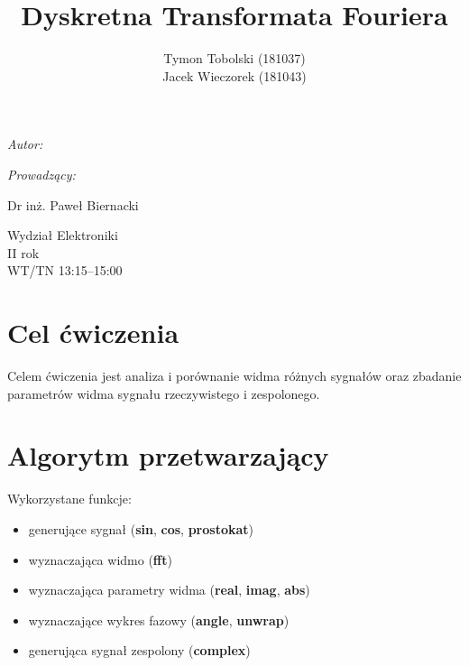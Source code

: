 \documentclass[wide,a4paper,titlepage,12pt]{mwart}
\title{Dyskretna Transformata Fouriera}
\author{Tymon Tobolski (181037)\\ Jacek Wieczorek (181043)}
\makeatletter
\renewcommand{\maketitle}{
\begin{titlepage}
  \begin{center}
    \vspace*{3cm}
    \LARGE \@title \par
    \vspace{2cm}
    \textit{\small Autor:}\par
    \normalsize \@author\par \normalsize
    \vspace{3cm}
    \textit{\small Prowadzący:}\par
    Dr inż. Paweł Biernacki \par
    \vspace{2cm}
    Wydział Elektroniki\\ II rok\\ WT/TN 13:15--15:00 \par
    \vspace{5cm}
    \small \@date
  \end{center}
\end{titlepage}
}
\makeatother
\begin{document}
  \maketitle
  \section{Cel ćwiczenia} %
  \label{sec:Cel}
    Celem ćwiczenia jest analiza i porównanie widma różnych sygnałów oraz zbadanie parametrów widma sygnału rzeczywistego i zespolonego.
    
  \section{Algorytm przetwarzający}
    Wykorzystane funkcje:
    \newline
    \begin{itemize}
      \item generujące sygnał (\textbf{sin}, \textbf{cos}, \textbf{prostokat})
			\item wyznaczająca widmo (\textbf{fft})
			\item wyznaczająca parametry widma (\textbf{real}, \textbf{imag}, \textbf{abs})
			\item wyznaczające wykres fazowy (\textbf{angle}, \textbf{unwrap})
			\item generująca sygnał zespolony (\textbf{complex})
    \end{itemize}
  
  \lstset{ %
    language=Octave,                %
    basicstyle=\scriptsize,       %
    numbers=left,                   %
    numberstyle=\scriptsize,      %
    stepnumber=10,                   %
    numbersep=9pt,                  %
    showspaces=false,               %
    showstringspaces=false,         %
    showtabs=false,                 %
    breaklines=true,                %
    }
    
    
\end{document}
